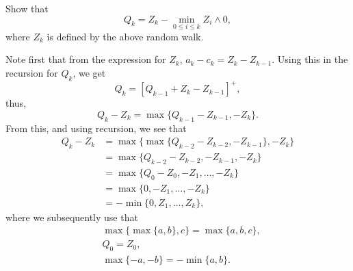 \begin{question}
Show that 
\begin{equation*}
  Q_k = Z_k - \min_{0\leq i \leq k} Z_i\wedge 0,
\end{equation*}
where $Z_k$ is defined by the above random walk.  

\begin{hint}
  
\end{hint}
 
\begin{solution}
Note first that from the expression
for $Z_k$, $a_k - c_k = Z_k - Z_{k-1}$. Using this in the recursion
for $Q_k$, we get
\begin{equation*}
  Q_k = [Q_{k-1} +Z_k- Z_{k-1}]^+,
\end{equation*}
thus, 
\begin{equation*}
  Q_k - Z_{k} = \max\{Q_{k-1} - Z_{k-1}, -Z_k\}.
\end{equation*}
From this, and using recursion, we see that
\begin{equation*}
  \begin{split}
  Q_k - Z_{k} 
&= \max\{\max\{Q_{k-2} - Z_{k-2}, -Z_{k-1}\}, -Z_k\} \\
&= \max\{Q_{k-2} - Z_{k-2}, -Z_{k-1}, -Z_k\} \\
&= \max\{Q_{0} - Z_{0}, -Z_1, \ldots, -Z_k\} \\
&= \max\{0, -Z_1, \ldots, -Z_k\} \\
&= - \min\{0, Z_1, \ldots, Z_k\},
  \end{split}
  \end{equation*}
where we subsequently use that
\begin{align*}
&\max\{\max\{a,b\}, c\} = \max\{a,b,c\}, \\
&Q_0 = Z_0, \\
&\max\{-a, -b \} = -\min\{a,b\}.
\end{align*}
 
  
\end{solution}
\end{question}



